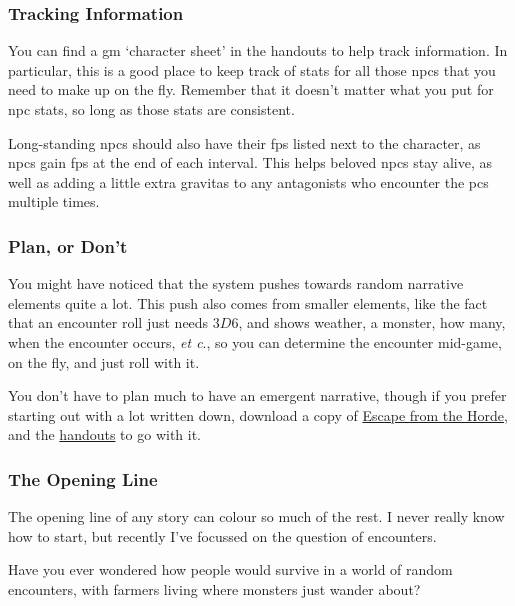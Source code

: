 \begin{multicols}{2}
\subsubsection{Tracking Information}

You can find a \gls{gm} `character sheet' in the handouts to help track information.
In particular, this is a good place to keep track of stats for all those \glspl{npc} that you need to make up on the fly.
Remember that it doesn't matter what you put for \gls{npc} stats, so long as those stats are consistent.

Long-standing \glspl{npc} should also have their \glspl{fp} listed next to the character, as \glspl{npc} gain \glspl{fp} at the end of each \gls{interval}.
This helps beloved \glspl{npc} stay alive, as well as adding a little extra gravitas to any antagonists who encounter the \glspl{pc} multiple times.

\subsubsection{Plan, or Don't}

You might have noticed that the system pushes towards random narrative elements quite a lot.
This push also comes from smaller elements, like the fact that an encounter roll just needs $3D6$, and shows weather, a monster, how many, when the encounter occurs, \textit{et c}., so you can determine the encounter mid-game, on the fly, and just roll with it.

You don't have to plan much to have an emergent narrative, though if you prefer starting out with a lot written down, download a copy of
\href{https://gitlab.com/bindrpg/oneshot/-/jobs/artifacts/master/raw/hardcore_horde_escape.pdf?job=build}{Escape from the Horde}, and the
\href{https://gitlab.com/bindrpg/oneshot/-/jobs/artifacts/master/raw/hardcore_handouts.pdf?job=build}{handouts} to go with it. 

\subsubsection{The Opening Line}

The opening line of any story can colour so much of the rest.
I never really know how to start, but recently I've focussed on the question of encounters.

\begin{speechtext}
  Have you ever wondered how people would survive in a world of random encounters, with farmers living where monsters just wander about?
\end{speechtext}


\end{multicols}
